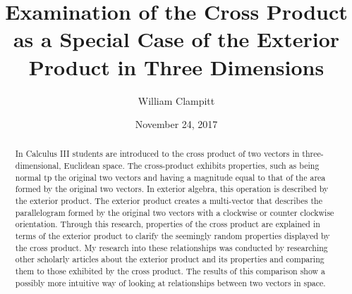 \documentclass{amsart}
\title
[Examination of the Cross Product] %
{Examination of the Cross Product as a Special Case of the Exterior Product in Three Dimensions}
\author{William Clampitt}
\date{November 24, 2017}
\begin{document}
	
	\begin{abstract}
		In Calculus III students are introduced to the cross product of two vectors in three-dimensional, Euclidean space. The cross-product exhibits properties, such as being normal tp the original two vectors and having a magnitude equal to that of the area formed by the original two vectors. In exterior algebra, this operation is described by the exterior product. The exterior product creates a multi-vector that describes the parallelogram formed by the original two vectors with a clockwise or counter clockwise orientation. Through this research, properties of the cross product are explained in terms of the exterior product to clarify the seemingly random properties displayed by the cross product. My research into these relationships was conducted by researching other scholarly articles about the exterior product and its properties and comparing them to those exhibited by the cross product. The results of this comparison show a possibly more intuitive way of looking at relationships between two vectors in space.
	\end{abstract}

	\maketitle
	\newpage
	
\end{document}
